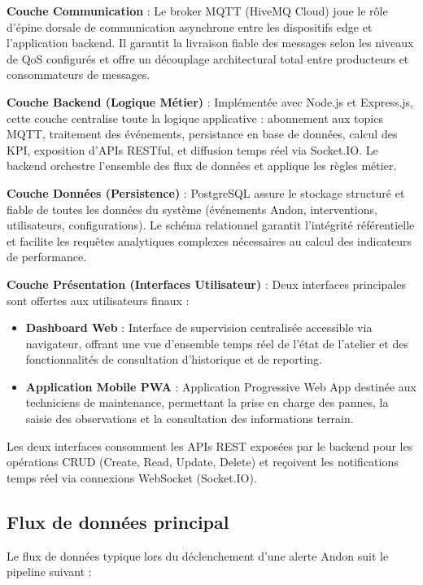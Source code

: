 \textbf{Couche Communication} : Le broker MQTT (HiveMQ Cloud) joue le rôle d'épine dorsale de communication asynchrone entre les dispositifs edge et l'application backend. Il garantit la livraison fiable des messages selon les niveaux de QoS configurés et offre un découplage architectural total entre producteurs et consommateurs de messages.

\textbf{Couche Backend (Logique Métier)} : Implémentée avec Node.js et Express.js, cette couche centralise toute la logique applicative : abonnement aux topics MQTT, traitement des événements, persistance en base de données, calcul des KPI, exposition d'APIs RESTful, et diffusion temps réel via Socket.IO. Le backend orchestre l'ensemble des flux de données et applique les règles métier.

\textbf{Couche Données (Persistence)} : PostgreSQL assure le stockage structuré et fiable de toutes les données du système (événements Andon, interventions, utilisateurs, configurations). Le schéma relationnel garantit l'intégrité référentielle et facilite les requêtes analytiques complexes nécessaires au calcul des indicateurs de performance.

\textbf{Couche Présentation (Interfaces Utilisateur)} : Deux interfaces principales sont offertes aux utilisateurs finaux :

\begin{itemize}
    \item \textbf{Dashboard Web} : Interface de supervision centralisée accessible via navigateur, offrant une vue d'ensemble temps réel de l'état de l'atelier et des fonctionnalités de consultation d'historique et de reporting.
    
    \item \textbf{Application Mobile PWA} : Application Progressive Web App destinée aux techniciens de maintenance, permettant la prise en charge des pannes, la saisie des observations et la consultation des informations terrain.
\end{itemize}


Les deux interfaces consomment les APIs REST exposées par le backend pour les opérations CRUD (Create, Read, Update, Delete) et reçoivent les notifications temps réel via connexions WebSocket (Socket.IO).

\subsection{Flux de données principal}

Le flux de données typique lors du déclenchement d'une alerte Andon suit le pipeline suivant :

